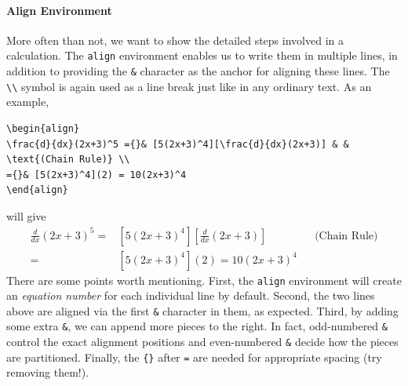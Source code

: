\paragraph{Align Environment}
More often than not, we want to show the detailed steps involved in a calculation. The \texttt{align} environment enables us to write them in multiple lines, in addition to providing the \texttt{\&}\index{\texttt{\&}} character as the anchor for aligning these lines. The \texttt{\textbackslash\textbackslash}\index{\texttt{\textbackslash \textbackslash}} symbol is again used as a line break just like in any ordinary text. As an example,
\begin{lstlisting}
\begin{align}
\frac{d}{dx}(2x+3)^5 ={}& [5(2x+3)^4][\frac{d}{dx}(2x+3)] & & \text{(Chain Rule)} \\
={}& [5(2x+3)^4](2) = 10(2x+3)^4
\end{align}
\end{lstlisting}
will give
\begin{align}
\frac{d}{dx}(2x+3)^5 ={}& [5(2x+3)^4][\frac{d}{dx}(2x+3)] & & \text{(Chain Rule)} \\
={}& [5(2x+3)^4](2) = 10(2x+3)^4
\end{align}
There are some points worth mentioning. First, the \texttt{align} environment will create an \textit{equation number} for each individual line by default. Second, the two lines above are aligned via the first \texttt{\&} character in them, as expected. Third, by adding some extra \texttt{\&}, we can append more pieces to the right. In fact, odd-numbered \texttt{\&} control the exact alignment positions and even-numbered \texttt{\&} decide how the pieces are partitioned. Finally, the \texttt{\{\}} after \texttt{=} are needed for appropriate spacing (try removing them!).

